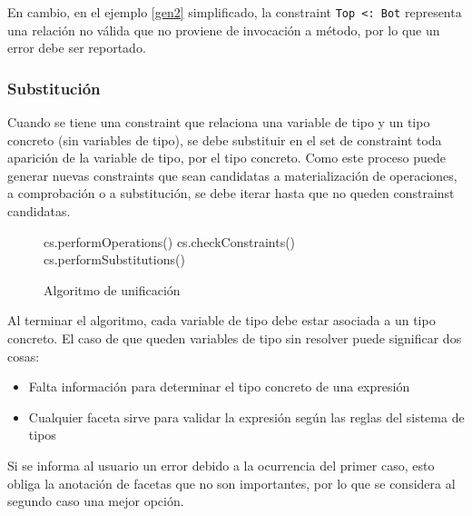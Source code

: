 En cambio, en el ejemplo \ref{gen2} simplificado, la constraint \texttt{Top <: Bot} representa una relación no válida que no proviene de invocación a método, por lo que un error debe ser reportado.

\subsubsection{Substitución}
Cuando se tiene una constraint que relaciona una variable de tipo y un tipo concreto (sin variables de tipo), se debe substituir en el set de constraint toda aparición de la variable de tipo, por el tipo concreto. Como este proceso puede generar nuevas constraints que sean candidatas a materialización de operaciones, a comprobación o a substitución, se debe iterar hasta que no queden constrainst candidatas.

\begin{figure}[ht]
  \centering
  \label{pseudouni}
  \begin{mdframed}
    \begin{algorithmic}
            \State cs.performOperations()
            \State cs.checkConstraints()
            \State cs.performSubstitutions()
          \EndWhile
      \EndFunction
    \end{algorithmic}
  \end{mdframed}
  \caption{Algoritmo de unificación}
\end{figure}

Al terminar el algoritmo, cada variable de tipo debe estar asociada a un tipo concreto. El caso de que queden variables de tipo sin resolver puede significar dos cosas:

\begin{itemize}
  \item Falta información para determinar el tipo concreto de una expresión
  \item Cualquier faceta sirve para validar la expresión según las reglas del sistema de tipos
\end{itemize}

Si se informa al usuario un error debido a la ocurrencia del primer caso, esto obliga la anotación de facetas que no son importantes, por lo que se considera al segundo caso una mejor opción.

